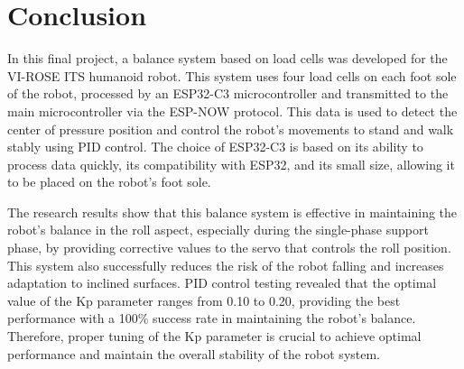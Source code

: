 \section{Conclusion}
\label{sec:conclusion}

In this final project, a balance system based on load cells was developed for the VI-ROSE ITS humanoid robot. This system uses four load cells on each foot sole of the robot, processed by an ESP32-C3 microcontroller and transmitted to the main microcontroller via the ESP-NOW protocol. This data is used to detect the center of pressure position and control the robot's movements to stand and walk stably using PID control. The choice of ESP32-C3 is based on its ability to process data quickly, its compatibility with ESP32, and its small size, allowing it to be placed on the robot's foot sole.

The research results show that this balance system is effective in maintaining the robot's balance in the roll aspect, especially during the single-phase support phase, by providing corrective values to the servo that controls the roll position. This system also successfully reduces the risk of the robot falling and increases adaptation to inclined surfaces. PID control testing revealed that the optimal value of the Kp parameter ranges from 0.10 to 0.20, providing the best performance with a 100\% success rate in maintaining the robot's balance. Therefore, proper tuning of the Kp parameter is crucial to achieve optimal performance and maintain the overall stability of the robot system.
